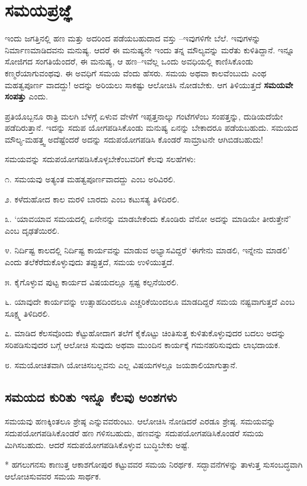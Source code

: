 
\chapter{ಸಮಯಪ್ರಜ್ಞೆ}

ಇಂದು ಜಗತ್ತಿನಲ್ಲಿ ಹಣ ಮತ್ತು ಅದರಿಂದ ಪಡೆಯಬಹುದಾದ ವಸ್ತು –ಇವುಗಳಿಗೇ ಬೆಲೆ. ಇವುಗಳನ್ನು ನಿರ್ಮಾಣಮಾಡಿದವನು ಮನುಷ್ಯ. ಆದರೆ ಈ ಮನುಷ್ಯನೇ ಇಂದು ತನ್ನ ಮೌಲ್ಯವನ್ನು ಮರೆತು ಕುಳಿತಿದ್ದಾನೆ. ಇನ್ನೂ ಸೋಜಿಗದ ಸಂಗತಿಯೆಂದರೆ, ಈ ಮನುಷ್ಯ, ಆ ಹಣ–ಇವೆಲ್ಲ ಒಂದು ಅವಧಿಯಲ್ಲಿ ಕಾಣಿಸಿಕೊಂಡು ಕಣ್ಮರೆಯಾಗುವಂಥವು. ಈ ಅವಧಿಗೆ ಸಮಯ ವೆಂದು ಹೆಸರು. ಸಮಯ ಅಥವಾ ಕಾಲವೆಂಬುದು ಎಂಥ ಮಹತ್ವಪೂರ್ಣ ವಾದದ್ದು! ಅದನ್ನು ಅರಿಯಲು ಸಾಕಷ್ಟು ಆಲೋಚಿಸಿ ನೋಡಬೇಕು. ಆಗ ತಿಳಿಯುತ್ತದೆ \textbf{ಸಮಯವೇ ಸಂಪತ್ತು} ಎಂದು.

ಪ್ರತಿಯೊಬ್ಬನೂ ರಾತ್ರಿ ಮಲಗಿ ಬೆಳಗ್ಗೆ ಏಳುವ ವೇಳೆಗೆ ಇಪ್ಪತ್ತನಾಲ್ಕು ಗಂಟೆಗಳೆಂಬ ಸಂಪತ್ತನ್ನು, ದುಡಿಯದೆಯೇ ಪಡೆದಿರುತ್ತಾನೆ. ಇದನ್ನು ಸದುಪ ಯೋಗಪಡಿಸಿಕೊಂಡು ಮನುಷ್ಯ ಏನನ್ನು ಬೇಕಾದರೂ ಪಡೆಯಬಹುದು. ಸಮಯದ ಮೌಲ್ಯ-ಮಹತ್ತ್ವ ಅದೆಷ್ಟೆಂದರೆ ಅದನ್ನು ಸದುಪಯೋಗಪಡಿಸಿ ಕೊಂಡರೆ ಸಾಮ್ರಾಟನೇ ಆಗಿಬಿಡಬಹುದು!

ಸಮಯವನ್ನು ಸದುಪಯೋಗಪಡಿಸಿಕೊಳ್ಳಬೇಕೆಂಬವರಿಗೆ ಕೆಲವು ಸಲಹೆಗಳು:

೧. ಸಮಯವು ಅತ್ಯಂತ ಮಹತ್ವಪೂರ್ಣವಾದದ್ದು ಎಂಬ ಅರಿವಿರಲಿ.

೨. ಕಳೆದುಹೋದ ಕಾಲ ಮರಳಿ ಬಾರದು ಎಂಬ ಕಟುಸತ್ಯ ತಿಳಿದಿರಲಿ.

೩. ‘ಯಾವಯಾವ ಸಮಯದಲ್ಲಿ ಏನೇನನ್ನು ಮಾಡಬೇಕೆಂದು ಕೊಂಡಿರು ವೆನೋ ಅದನ್ನು ಮಾಡಿಯೇ ತೀರುತ್ತೇನೆ’ ಎಂಬ ದೃಢತೆಯಿರಲಿ.

೪. ನಿರ್ದಿಷ್ಟ ಕಾಲದಲ್ಲಿ ನಿರ್ದಿಷ್ಟ ಕಾರ್ಯವನ್ನು ಮಾಡುವ ಅಭ್ಯಾಸವಿದ್ದರೆ ‘ಈಗೇನು ಮಾಡಲಿ, ಇನ್ನೇನು ಮಾಡಲಿ’ ಎಂದು ತಲೆಕೆರೆದುಕೊಳ್ಳುವುದು ತಪ್ಪುತ್ತದೆ, ಸಮಯ ಉಳಿಯುತ್ತದೆ.

೫. ಕೈಗೊಳ್ಳುವ ಪುಟ್ಟ ಕಾರ್ಯದ ವಿಷಯದಲ್ಲೂ ಸ್ಪಷ್ಟ ಕಲ್ಪನೆಯಿರಲಿ.

೬. ಯಾವುದೇ ಕಾರ್ಯವನ್ನು ಉತ್ಸಾಹದಿಂದಲೂ ಎಚ್ಚರಿಕೆಯಿಂದಲೂ ಮಾಡದಿದ್ದರೆ ಸಮಯ ನಷ್ಟವಾಗುತ್ತದೆ ಎಂಬ ಸೂಕ್ಷ್ಮ ತಿಳಿದಿರಲಿ.

೭. ಮಾಡಿದ ಕೆಲಸವೊಂದು ಕೆಟ್ಟುಹೋದಾಗ ತಲೆಗೆ ಕೈಕೊಟ್ಟು ಚಿಂತಿಸುತ್ತ ಕುಳಿತುಕೊಳ್ಳುವುದರ ಬದಲು ಅದನ್ನು ಸರಿಪಡಿಸುವುದರ ಬಗ್ಗೆ ಆಲೋಚಿ ಸುವುದು ಅಥವಾ ಮುಂದಿನ ಕಾರ್ಯಕ್ಕೆ ಗಮನಹರಿಸುವುದು ಲಾಭದಾಯಕ.

೮. ಸಮಯೋಚಿತವಾಗಿ ಯೋಚಿಸಬಲ್ಲವನು ಎಲ್ಲ ವಿಷಯಗಳಲ್ಲೂ ಜಯಶಾಲಿಯಾಗುತ್ತಾನೆ.

\section{ಸಮಯದ ಕುರಿತು ಇನ್ನೂ ಕೆಲವು ಅಂಶಗಳು}

ಸಮಯವು ಹಣಕ್ಕಿಂತಲೂ ಶ್ರೇಷ್ಠ ಎನ್ನುವವರುಂಟು. ಆಲೋಚಿಸಿ ನೋಡಿದರೆ ಎರಡೂ ಶ್ರೇಷ್ಠ. ಸಮಯವನ್ನು ಸದುಪಯೋಗಪಡಿಸಿಕೊಂಡರೆ ಹಣ ಗಳಿಸಬಹುದು, ಹಣವನ್ನು ಸದುಪಯೋಗಪಡಿಸಿಕೊಂಡರೆ ಸಮಯ ಮಿಗಿಸಬಹುದು. ಆದರೆ ಸದುಪಯೋಗಪಡಿಸಿಕೊಳ್ಳುವ ಬುದ್ಧಿಬೇಕು ಅಷ್ಟೆ.

* ಹಗಲುಗನಸು ಕಾಣುತ್ತ ಆಕಾಶಗೋಪುರ ಕಟ್ಟುವವರ ಸಮಯ ನಿರರ್ಥಕ. ಸದ್ಭಾವನೆಗಳನ್ನು ತಾಳುತ್ತ ಸುಸಂಬದ್ಧವಾಗಿ ಆಲೋಚಿಸುವವರ ಸಮಯ ಸಾರ್ಥಕ.

